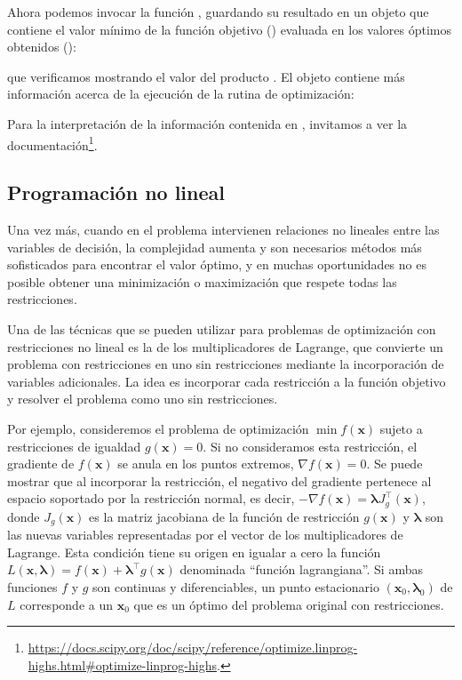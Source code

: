 
Ahora podemos invocar la función , guardando su resultado en un objeto  que contiene el valor mínimo de la función objetivo () evaluada en los valores óptimos obtenidos ():


\noindent que verificamos mostrando el valor del producto . El objeto  contiene más información acerca de la ejecución de la rutina de optimización:


Para la interpretación de la información contenida en , invitamos a ver la documentación\footnote{\url{https://docs.scipy.org/doc/scipy/reference/optimize.linprog-highs.html\#optimize-linprog-highs}.}.

\subsection{Programación no lineal}
Una vez más, cuando en el problema intervienen relaciones no lineales entre las variables de decisión, la complejidad aumenta y son necesarios métodos más sofisticados para encontrar el valor óptimo, y en muchas oportunidades no es posible obtener una minimización o maximización que respete todas las restricciones. 

Una de las técnicas que se pueden utilizar para problemas de optimización con restricciones no lineal es la de los multiplicadores de Lagrange, que convierte un problema con restricciones en uno sin restricciones mediante la incorporación de variables adicionales. La idea es incorporar cada restricción a la función objetivo y resolver el problema como uno sin restricciones.

Por ejemplo, consideremos el problema de optimización $\min f(\bm{x})$ sujeto a restricciones de igualdad $g(\bm{x}) = 0$. Si no consideramos esta restricción, el gradiente de $f(\bm{x})$ se anula en los puntos extremos, $\nabla f(\bm{x}) = 0$. Se puede mostrar que al incorporar la restricción, el negativo del gradiente pertenece al espacio soportado por la restricción normal, es decir, $-\nabla f(\bm{x}) = \bm{\lambda } J_g^{\intercal}(\bm{x})$, donde $J_g(\bm{x})$ es la matriz jacobiana de la función de restricción $g(\bm{x})$ y $\bm{\lambda}$ son las nuevas variables representadas por el vector de los multiplicadores de Lagrange. Esta condición tiene su origen en igualar a cero la función $L(\bm{x}, \bm{\lambda}) = f(\bm{x}) + \bm{\lambda}^{\intercal} g(\bm{x})$ denominada ``función lagrangiana''. Si ambas funciones $f$ y $g$ son continuas y diferenciables, un punto estacionario $(\bm{x}_0, \bm{\lambda}_0)$ de $L$ corresponde a un $\bm{x}_0$ que es un óptimo del problema original con restricciones.

